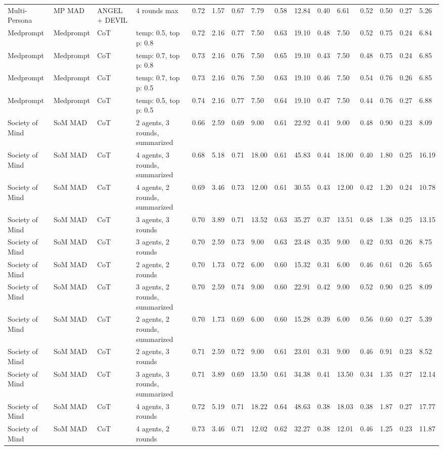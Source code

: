 \begin{landscape}
\begin{longtable}{p{2cm}p{1.5cm}p{1cm}p{2.5cm}llllllllllll}
Multi-Persona & MP MAD & ANGEL + DEVIL & 4 rounds max & 0.72 & 1.57 & 0.67 & 7.79 & 0.58 & 12.84 & 0.40 & 6.61 & 0.52 & 0.50 & 0.27 & 5.26 \\
Medprompt & Medprompt & CoT & temp: 0.5, top p: 0.8 & 0.72 & 2.16 & 0.77 & 7.50 & 0.63 & 19.10 & 0.48 & 7.50 & 0.52 & 0.75 & 0.24 & 6.84 \\
Medprompt & Medprompt & CoT & temp: 0.7, top p: 0.8 & 0.73 & 2.16 & 0.76 & 7.50 & 0.65 & 19.10 & 0.43 & 7.50 & 0.48 & 0.75 & 0.24 & 6.85 \\
Medprompt & Medprompt & CoT & temp: 0.7, top p: 0.5 & 0.73 & 2.16 & 0.76 & 7.50 & 0.63 & 19.10 & 0.46 & 7.50 & 0.54 & 0.76 & 0.26 & 6.85 \\
Medprompt & Medprompt & CoT & temp: 0.5, top p: 0.5 & 0.74 & 2.16 & 0.77 & 7.50 & 0.64 & 19.10 & 0.47 & 7.50 & 0.44 & 0.76 & 0.27 & 6.88 \\
Society of Mind & SoM MAD & CoT & 2 agents, 3 rounds, summarized & 0.66 & 2.59 & 0.69 & 9.00 & 0.61 & 22.92 & 0.41 & 9.00 & 0.48 & 0.90 & 0.23 & 8.09 \\
Society of Mind & SoM MAD & CoT & 4 agents, 3 rounds, summarized & 0.68 & 5.18 & 0.71 & 18.00 & 0.61 & 45.83 & 0.44 & 18.00 & 0.40 & 1.80 & 0.25 & 16.19 \\
Society of Mind & SoM MAD & CoT & 4 agents, 2 rounds, summarized & 0.69 & 3.46 & 0.73 & 12.00 & 0.61 & 30.55 & 0.43 & 12.00 & 0.42 & 1.20 & 0.24 & 10.78 \\
Society of Mind & SoM MAD & CoT & 3 agents, 3 rounds & 0.70 & 3.89 & 0.71 & 13.52 & 0.63 & 35.27 & 0.37 & 13.51 & 0.48 & 1.38 & 0.25 & 13.15 \\
Society of Mind & SoM MAD & CoT & 3 agents, 2 rounds & 0.70 & 2.59 & 0.73 & 9.00 & 0.63 & 23.48 & 0.35 & 9.00 & 0.42 & 0.93 & 0.26 & 8.75 \\
Society of Mind & SoM MAD & CoT & 2 agents, 2 rounds & 0.70 & 1.73 & 0.72 & 6.00 & 0.60 & 15.32 & 0.31 & 6.00 & 0.46 & 0.61 & 0.26 & 5.65 \\
Society of Mind & SoM MAD & CoT & 3 agents, 2 rounds, summarized & 0.70 & 2.59 & 0.74 & 9.00 & 0.60 & 22.91 & 0.42 & 9.00 & 0.52 & 0.90 & 0.25 & 8.09 \\
Society of Mind & SoM MAD & CoT & 2 agents, 2 rounds, summarized & 0.70 & 1.73 & 0.69 & 6.00 & 0.60 & 15.28 & 0.39 & 6.00 & 0.56 & 0.60 & 0.27 & 5.39 \\
Society of Mind & SoM MAD & CoT & 2 agents, 3 rounds & 0.71 & 2.59 & 0.72 & 9.00 & 0.61 & 23.01 & 0.31 & 9.00 & 0.46 & 0.91 & 0.23 & 8.52 \\
Society of Mind & SoM MAD & CoT & 3 agents, 3 rounds, summarized & 0.71 & 3.89 & 0.69 & 13.50 & 0.61 & 34.38 & 0.41 & 13.50 & 0.34 & 1.35 & 0.27 & 12.14 \\
Society of Mind & SoM MAD & CoT & 4 agents, 3 rounds & 0.72 & 5.19 & 0.71 & 18.22 & 0.64 & 48.63 & 0.38 & 18.03 & 0.38 & 1.87 & 0.27 & 17.77 \\
Society of Mind & SoM MAD & CoT & 4 agents, 2 rounds & 0.73 & 3.46 & 0.71 & 12.02 & 0.62 & 32.27 & 0.38 & 12.01 & 0.46 & 1.25 & 0.23 & 11.87 \\


\end{longtable}
\end{landscape}
